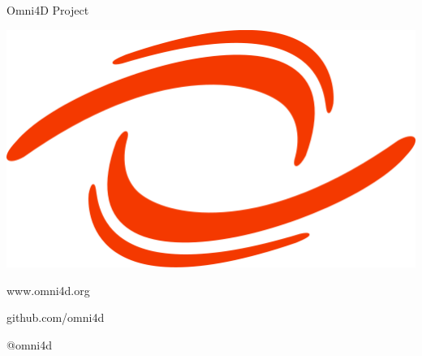

\begin{frame}{Omni4D Project}

  \includegraphics[scale=1.5]{images/omni4d}
  \begin{description}
    \item www.omni4d.org
    \item [Github] github.com/omni4d
    \item [Twitter] @omni4d
  \end{description}

  \speakernote{
  }
\end{frame}
